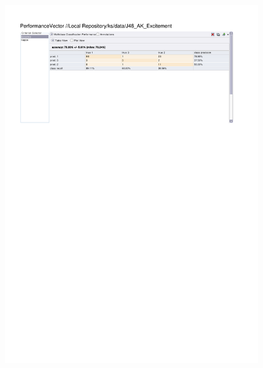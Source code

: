 \begin{figure}[htp]
  \centerline{\includegraphics[trim=0 683 0 60,clip,width=16.09cm]{results/J48_A_Excitement.pdf}} \caption{
} \label{J48_K_Excitement}
\end{figure}

